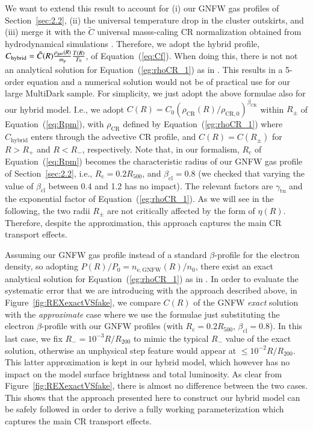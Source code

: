 \documentclass[traditabstract]{aa}
\newcommand{\rmn}{\mathrm}
\begin{document}
\begin{appendix}
We want to extend this result to account for (i) our GNFW gas profiles of Section~\ref{sec:2.2}, 
(ii) the universal temperature drop in the cluster outskirts, and (iii) merge it with the $\tilde{C}$ 
universal masss-caling CR normalization obtained from hydrodynamical simulations \citep{2010MNRAS.409..449P}. 
Therefore, we adopt the hybrid profile, $C_{\rm{hybrid}} = \tilde{C}(R) \frac{\rho_{\rmn{gas}}(R)}{m_\rmn{p}} \frac{T(R)}{T_0}$,
of Equation~(\ref{eq:Cf}). When doing this, there is not not an analytical solution for Equation~(\ref{eg:rhoCR_1}) 
as in \cite{2011A&A...527A..99E}. This results in a 5-order equation and a numerical 
solution would not be of practical use for our large MultiDark sample. For simplicity, 
we just adopt the above formulae also for our hybrid model. I.e., we adopt 
$C(R)=C_{0}(\rho_{\rmn{CR}}(R)/\rho_{\rmn{CR},0})^{\beta_{\rmn{CR}}}$
within $R_{\pm}$ of Equation~(\ref{eq:Rpm}), with $\rho_{\rmn{CR}}$ defined by 
Equation~(\ref{eg:rhoCR_1}) where $C_{\rmn{hybrid}}$ enters through the advective
CR profile, and $C(R) = C(R_{\pm})$ for $R > R_{+}$ and $R < R_{-}$, respectively.
Note that, in our formalism, $R_{\rmn{c}}$ of Equation~(\ref{eq:Rpm}) becomes the 
characteristic radius of our GNFW gas profile of Section~\ref{sec:2.2}, i.e., 
$R_{\rmn{c}} = 0.2 R_{500}$, and $\beta_{\rmn{cl}}=0.8$ (we checked that 
varying the value of $\beta_{\rmn{cl}}$ between 0.4 and 1.2 has no impact).
The relevant factors are $\gamma_{\rmn{tu}}$ and the exponential factor of 
Equation~(\ref{eg:rhoCR_1}). As we will see in the following, the two radii $R_{\pm}$ 
are not critically affected by the form of $\eta(R)$. Therefore, despite the approximation, 
this approach captures the main CR transport effects. 

Assuming our GNFW gas profile instead of a standard $\beta$-profile for the electron density,
so adopting $P(R)/P_{0}=n_{\rmn{e,GNFW}}(R)/n_{0}$, there exist an exact analytical solution 
for Equation~(\ref{eg:rhoCR_1}) as in \cite{2011A&A...527A..99E}. In order to evaluate the systematic 
error that we are introducing with the approach described above, in Figure~\ref{fig:REXexactVSfake}, we 
compare $C(R)$ of the GNFW \emph{exact} solution with the \emph{approximate} case where we use the 
\cite{2011A&A...527A..99E} formulae just substituting the electron $\beta$-profile with our GNFW
profiles (with $R_{\rmn{c}} = 0.2 R_{500}$, $\beta_{\rmn{cl}}=0.8$). In this last case, we fix 
$R_{-}=10^{-3}R/R_{200}$ to mimic the typical $R_{-}$ value of the exact solution, otherwise an unphysical 
step feature would appear at $\leq10^{-2}R/R_{200}$. This latter approximation is kept in our hybrid model, 
which however has no impact on the model surface brightness and total luminosity. As clear from 
Figure~\ref{fig:REXexactVSfake}, there is almost no difference between the two cases. This shows 
that the approach presented here to construct our hybrid model can be safely followed 
in order to derive a fully working parameterization which captures the main CR transport effects. 


\end{appendix}
\end{document}
